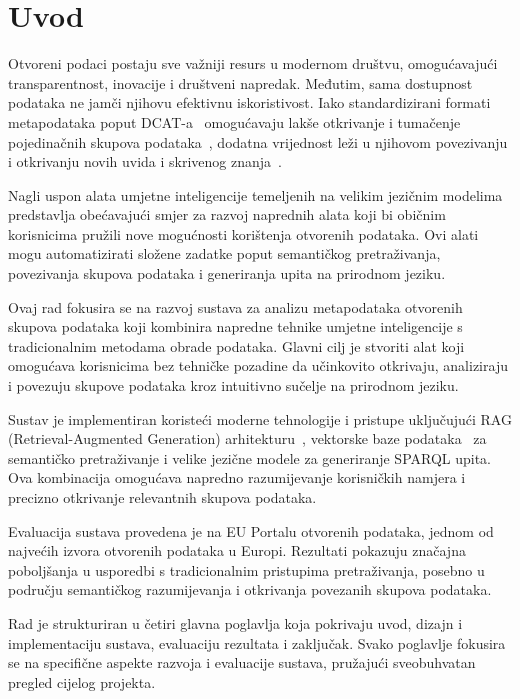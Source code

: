 \chapter{Uvod}
\label{ch:introduction_background}


Otvoreni podaci postaju sve važniji resurs u modernom društvu, omogućavajući transparentnost, inovacije i društveni napredak. Međutim, sama dostupnost podataka ne jamči njihovu efektivnu iskoristivost. Iako standardizirani formati metapodataka poput DCAT-a~\cite{dcat2020} omogućavaju lakše otkrivanje i tumačenje pojedinačnih skupova podataka~\cite{janssen2012benefits}, dodatna vrijednost leži u njihovom povezivanju i otkrivanju novih uvida i skrivenog znanja~\cite{bizer2009linked}.

Nagli uspon alata umjetne inteligencije temeljenih na velikim jezičnim modelima~\cite{brown2020language,devlin2018bert} predstavlja obećavajući smjer za razvoj naprednih alata koji bi običnim korisnicima pružili nove mogućnosti korištenja otvorenih podataka. Ovi alati mogu automatizirati složene zadatke poput semantičkog pretraživanja, povezivanja skupova podataka i generiranja upita na prirodnom jeziku.

Ovaj rad fokusira se na razvoj sustava za analizu metapodataka otvorenih skupova podataka koji kombinira napredne tehnike umjetne inteligencije s tradicionalnim metodama obrade podataka. Glavni cilj je stvoriti alat koji omogućava korisnicima bez tehničke pozadine da učinkovito otkrivaju, analiziraju i povezuju skupove podataka kroz intuitivno sučelje na prirodnom jeziku.

Sustav je implementiran koristeći moderne tehnologije i pristupe uključujući RAG (Retrieval-Augmented Generation) arhitekturu~\cite{lewis2020retrieval}, vektorske baze podataka~\cite{wang2023vector} za semantičko pretraživanje i velike jezične modele za generiranje SPARQL upita. Ova kombinacija omogućava napredno razumijevanje korisničkih namjera i precizno otkrivanje relevantnih skupova podataka.

Evaluacija sustava provedena je na EU Portalu otvorenih podataka, jednom od najvećih izvora otvorenih podataka u Europi. Rezultati pokazuju značajna poboljšanja u usporedbi s tradicionalnim pristupima pretraživanja, posebno u području semantičkog razumijevanja i otkrivanja povezanih skupova podataka.

Rad je strukturiran u četiri glavna poglavlja koja pokrivaju uvod, dizajn i implementaciju sustava, evaluaciju rezultata i zaključak. Svako poglavlje fokusira se na specifične aspekte razvoja i evaluacije sustava, pružajući sveobuhvatan pregled cijelog projekta.

